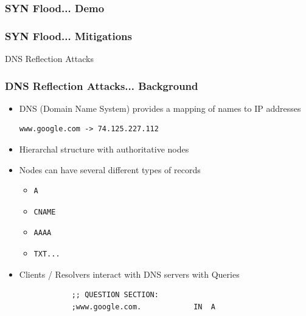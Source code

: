 \documentclass{beamer}
\begin{document}
\begin{frame}
	\frametitle{SYN Flood... Demo}
\end{frame}

\begin{frame}
	\frametitle{SYN Flood... Mitigations}

\end{frame}

\begin{frame}{DNS Reflection Attacks}

\end{frame}

\begin{frame}
	\frametitle{DNS Reflection Attacks... Background}
	\begin{itemize}
		\item DNS (Domain Name System) provides a mapping of names to IP addresses
			\begin{verbatim}www.google.com -> 74.125.227.112\end{verbatim}
		\item Hierarchal structure with authoritative nodes
		\item Nodes can have several different types of records
			\begin{itemize}
				\item \begin{verbatim}A\end{verbatim} %
				\item \begin{verbatim}CNAME\end{verbatim} 
				\item \begin{verbatim}AAAA\end{verbatim} 
				\item \begin{verbatim}TXT...\end{verbatim}
			\end{itemize}
		\item Clients / Resolvers interact with DNS servers with Queries
			\begin{lstlisting}
			;; QUESTION SECTION:
			;www.google.com.			IN	A


\end{lstlisting}
\end{itemize}
\end{frame}
\end{document}
